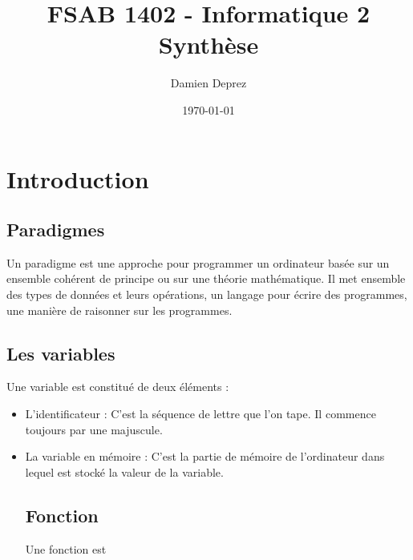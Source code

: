 \documentclass[12pt,a4paper,twoside]{report}
\begin{document}
\makeatletter

\author{Damien Deprez}
\title{FSAB 1402 - Informatique 2\\Synthèse}
\date{\today}
\titre{\@title}{\@author}{\@date}{}{}

\tableofcontents

\chapter{Introduction}
\section{Paradigmes}
Un paradigme est une approche pour programmer un ordinateur basée sur un ensemble cohérent de principe ou sur une théorie mathématique. Il met ensemble des types de données et leurs opérations, un langage pour écrire des programmes, une manière de raisonner sur les programmes.
\section{Les variables}
Une variable est constitué de deux éléments : 
\begin{itemize}
\item L'identificateur : C'est la séquence de lettre que l'on tape. Il commence toujours par une majuscule.
\item La variable en mémoire : C'est la partie de mémoire de l'ordinateur dans lequel est stocké la valeur de la variable.
\section{Fonction}
Une fonction est 
\end{itemize}
\end{document}
